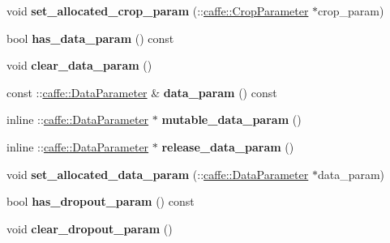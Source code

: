 \begin{DoxyCompactItemize}
void {\bfseries set\+\_\+allocated\+\_\+crop\+\_\+param} (\+::\mbox{\hyperlink{classcaffe_1_1_crop_parameter}{caffe\+::\+Crop\+Parameter}} $\ast$crop\+\_\+param)
\item 
\mbox{\label{classcaffe_1_1_layer_parameter_a2f49bd89a6eecba346262547288c8738}} 
bool {\bfseries has\+\_\+data\+\_\+param} () const
\item 
\mbox{\label{classcaffe_1_1_layer_parameter_a4dce2f61f4afabd3f73da41f4100137c}} 
void {\bfseries clear\+\_\+data\+\_\+param} ()
\item 
\mbox{\label{classcaffe_1_1_layer_parameter_a3dcf56ad079214f70e7917d8b4b5d9fd}} 
const \+::\mbox{\hyperlink{classcaffe_1_1_data_parameter}{caffe\+::\+Data\+Parameter}} \& {\bfseries data\+\_\+param} () const
\item 
\mbox{\label{classcaffe_1_1_layer_parameter_ae8bc4152308a54cac44134d52ddfcda7}} 
inline \+::\mbox{\hyperlink{classcaffe_1_1_data_parameter}{caffe\+::\+Data\+Parameter}} $\ast$ {\bfseries mutable\+\_\+data\+\_\+param} ()
\item 
\mbox{\label{classcaffe_1_1_layer_parameter_a0a0f99c9d3b85264d0a10d56c69168ca}} 
inline \+::\mbox{\hyperlink{classcaffe_1_1_data_parameter}{caffe\+::\+Data\+Parameter}} $\ast$ {\bfseries release\+\_\+data\+\_\+param} ()
\item 
\mbox{\label{classcaffe_1_1_layer_parameter_a6411f0501708d9a523c4d8e122cbf3f3}} 
void {\bfseries set\+\_\+allocated\+\_\+data\+\_\+param} (\+::\mbox{\hyperlink{classcaffe_1_1_data_parameter}{caffe\+::\+Data\+Parameter}} $\ast$data\+\_\+param)
\item 
\mbox{\label{classcaffe_1_1_layer_parameter_a6d6c78ca20ce0cbd0ebc59bafe30aa70}} 
bool {\bfseries has\+\_\+dropout\+\_\+param} () const
\item 
\mbox{\label{classcaffe_1_1_layer_parameter_a129cc7e885e5c302436025b39740df7d}} 
void {\bfseries clear\+\_\+dropout\+\_\+param} ()
\item 

\end{DoxyCompactItemize}
